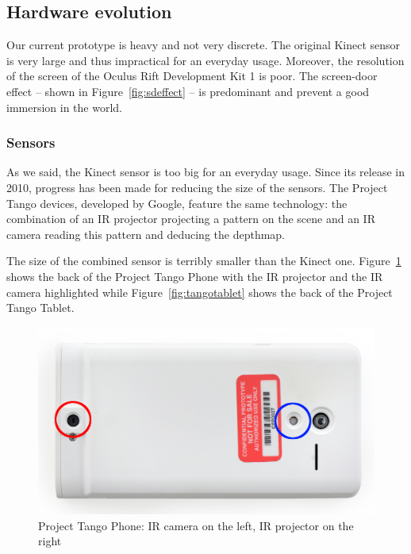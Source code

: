 \documentclass[12pt, twoside]{article}
\begin{document}
\subsection{Hardware evolution}
Our current prototype is heavy and not very discrete. The original Kinect sensor is very large and thus impractical for an everyday usage. Moreover, the resolution of the screen of the Oculus Rift Development Kit 1 is poor. The screen-door effect -- shown in Figure~\ref{fig:sdeffect} -- is predominant and prevent a good immersion in the world.
\subsubsection{Sensors}
As we said, the Kinect sensor is too big for an everyday usage. Since its release in 2010, progress has been made for reducing the size of the sensors. The Project Tango devices, developed by Google, feature the same technology: the combination of an IR projector projecting a pattern on the scene and an IR camera reading this pattern and deducing the depthmap.

The size of the combined sensor is terribly smaller than the Kinect one. Figure~\ref{fig:tangophone} shows the back of the Project Tango Phone with the IR projector and the IR camera highlighted while Figure~\ref{fig:tangotablet} shows the back of the Project Tango Tablet.

\begin{figure}[!h]
  \centering
  \includegraphics[scale=0.1]{TangoPhone.jpeg}
  \caption{\label{fig:tangophone} Project Tango Phone: IR camera on the left, IR projector on the right\protect\footnotemark}
\end{figure}
\end{document}
